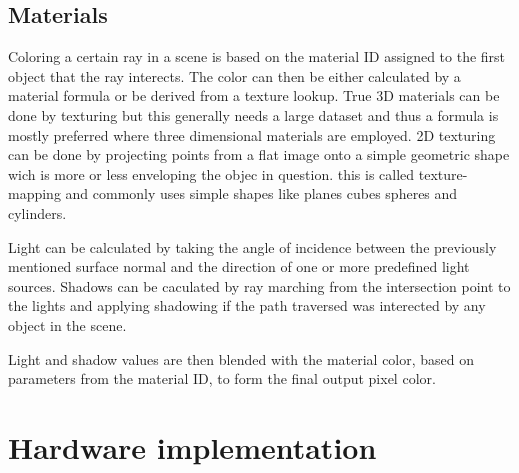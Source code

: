 			\subsection{Materials}
				Coloring a certain ray in a scene is based on the material ID
				assigned to the first object that the ray interects. The color
				can then be either calculated by a material formula or be 
				derived from a texture lookup. True 3D materials can be done by
				texturing but this generally needs a large dataset and thus a 
				formula is mostly preferred where three dimensional materials 
				are employed. 2D texturing can be done by projecting points from
				a flat image onto a simple geometric shape  wich is more or less 
				enveloping the objec in question. this is called texture-mapping 
				and commonly uses simple shapes like planes cubes spheres and 
				cylinders. 
				
				Light can be calculated by taking the angle of incidence between
				the previously mentioned surface normal and the direction of one 
				or more predefined light sources. Shadows can be caculated by 
				ray marching from the intersection point to the lights and 
				applying shadowing if the path traversed was interected by any
				object in the scene. 
				
				Light and shadow values are then blended with the material color,
				based on parameters from the material ID, to form the final 
				output pixel color.
						
		
	\section{Hardware implementation}
